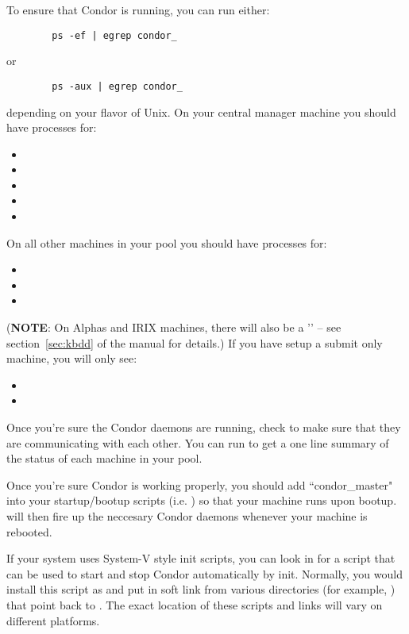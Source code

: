 To ensure that Condor is running, you can run either:
\begin{verbatim}
        ps -ef | egrep condor_
\end{verbatim}
or
\begin{verbatim}
        ps -aux | egrep condor_
\end{verbatim}
depending on your flavor of Unix.  On your central manager machine you
should have processes for:
\begin{itemize}
	\item {}
	\item {}
	\item {}
	\item {}
	\item {}
\end{itemize}
On all other machines in your pool you should have processes for:
\begin{itemize}
	\item {}
	\item {}
	\item {}
\end{itemize}
(\textbf{NOTE}: On Alphas and IRIX machines, there will also be a
	'' -- see section~\ref{sec:kbdd} of the manual for details.)
If you have setup a submit only machine, you will only see:
\begin{itemize}
	\item {}
	\item {}
\end{itemize}

Once you're sure the Condor daemons are running, check to make sure
that they are communicating with each other.  You can run
 to get a one line summary of the status of each
machine in your pool.

Once you're sure Condor is working properly, you should add
``condor\_master" into your startup/bootup scripts (i.e.  ) so
that your machine runs  upon bootup.  
will then fire up the neccesary Condor daemons whenever your machine
is rebooted.  

If your system uses System-V style init scripts, you can look in
 for a script that can be used
to start and stop Condor automatically by init.  Normally, you would
install this script as  and put in soft link from
various directories (for example, ) that point back to
.  The exact location of these scripts and links
will vary on different platforms.

